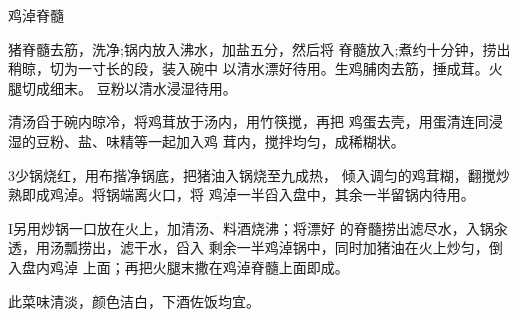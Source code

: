 \begin{recipe}{鸡淖脊髓}

\ingredients


\cooking

\step 猪脊髓去筋，洗净;锅内放入沸水，加盐五分，然后将 脊髓放入;煮约十分钟，捞出稍晾，切为一寸长的段，装入碗中 以清水漂好待用。生鸡脯肉去筋，捶成茸。火腿切成细末。 豆粉以清水浸湿待用。

\step 清汤舀于碗内晾冷，将鸡茸放于汤内，用竹筷搅，再把 鸡蛋去壳，用蛋清连同浸湿的豆粉、盐、味精等一起加入鸡 茸内，搅拌均匀，成稀糊状。

\step 3少锅烧红，用布揩净锅底，把猪油入锅烧至九成热， 倾入调匀的鸡茸糊，翻搅炒熟即成鸡淖。将锅端离火口，将 鸡淖一半舀入盘中，其余一半留锅内待用。

I另用炒锅一口放在火上，加清汤、料酒烧沸；将漂好 的脊髓捞出滤尽水，入锅汆透，用汤瓢捞出，滤干水，舀入 剩余一半鸡淖锅中，同时加猪油在火上炒匀，倒入盘内鸡淖 上面；再把火腿末撒在鸡淖脊髓上面即成。

\notes

此菜味清淡，颜色洁白，下酒佐饭均宜。

\end{recipe}


